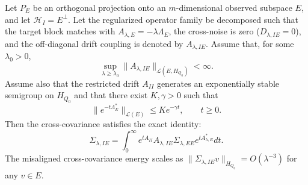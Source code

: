 \begin{theorem}
  \label{thm:misaligned_coupling}
  Let $P_E$ be an orthogonal projection onto an $m$-dimensional observed subspace $E$, and let $\mathcal{H}_I = E^\perp$. Let the regularized operator family be decomposed such that the target block matches  with $A_{\lambda,E} = -\lambda \Lambda_E$, the cross-noise is zero ($D_{\lambda,IE} = 0$), and the off-diagonal drift coupling is denoted by $A_{\lambda,IE}$.
  Assume that, for some $\lambda_0>0$,
  \[
    \sup_{\lambda\ge\lambda_0}
    \|A_{\lambda,IE}\|_{\mathcal L(E,H_{Q_0})}<\infty.
  \]
  Assume also that the restricted drift $A_{II}$ generates an exponentially stable semigroup on $H_{Q_0}$ and that there exist $K,\gamma>0$ such that
  \[
    \|e^{-t\Lambda_E^*}\|_{\mathcal L(E)}
    \le
    K e^{-\gamma t},
    \qquad t\ge0.
  \]
  Then the cross-covariance satisfies the exact identity:
  \begin{equation}
    \label{eq:misaligned_resolvent_identity}
    \Sigma_{\lambda,IE} = \int_0^\infty e^{t A_{II}} A_{\lambda,IE} \Sigma_{\lambda,EE} e^{t A_{\lambda,E}^*} dt.
  \end{equation}
  The misaligned cross-covariance energy scales as $\|\Sigma_{\lambda,IE} v\|_{H_{Q_0}} = O(\lambda^{-3})$ for any $v \in E$.
\end{theorem}
